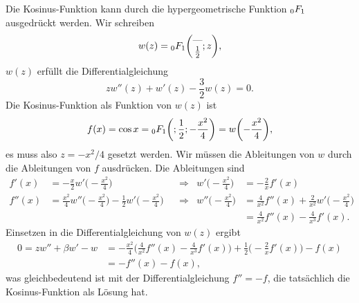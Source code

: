 \begin{beispiel}
Die Kosinus-Funktion kann durch die hypergeometrische Funktion
$\mathstrut_0F_1$ ausgedrückt werden.
Wir schreiben 
\[
w(z)
=
\mathstrut_0F_1\biggl(
\begin{matrix}\text{---}\\\frac12\end{matrix}
;z\biggr),
\]
$w(z)$ erfüllt die Differentialgleichung
\[
zw''(z) +w'(z) -\frac{3}{2} w(z) = 0.
\]
Die Kosinus-Funktion als Funktion von $w(z)$ ist
\[
f(x)
=
\cos x = \mathstrut_0F_1\biggl(;\frac12;-\frac{x^2}4\biggr)
=
w\biggl(-\frac{x^2}4\biggr),
\]
es muss also $z=-x^2/4$ gesetzt werden.
Wir müssen die Ableitungen von $w$ durch die Ableitungen von $f$
ausdrücken.
Die Ableitungen sind
\begin{align*}
f'(x)
&=
-\frac{x}{2}
w'\biggl(-\frac{x^2}4\biggr)
&&\Rightarrow&
w'\biggl(-\frac{x^2}4\biggr)
&=
-\frac{2}{x}f'(x)
\\
f''(x)
&=
\frac{x^2}{4}w''\biggl(-\frac{x^2}4\biggr)
-\frac12w'\biggl(-\frac{x^2}4\biggr)
&&\Rightarrow&
w''\biggl(-\frac{x^2}4\biggr)
&=
\frac{4}{x^2}f''(x)
+\frac{2}{x^2}w'\biggl(-\frac{x^2}4\biggr)
\\
&&&&
&=
\frac{4}{x^2}f''(x)
-\frac{4}{x^3}f'(x).
\end{align*}
Einsetzen in die Differentialgleichung von $w(z)$ ergibt
\begin{align*}
0=
zw''+\beta w'-w
&=
-\frac{x^2}4
\biggl(
\frac{4}{x^2}f''(x)-\frac{4}{x^3}f'(x)
\biggr)
+\frac12\biggl(
-\frac2xf'(x)
\biggr)
-f(x)
\\
&=
-f''(x)
-f(x),
\end{align*}
was gleichbedeutend ist mit der Differentialgleichung $f''=-f$, die
tatsächlich die Kosinus-Funktion als Lösung hat.
\end{beispiel}

%
%
